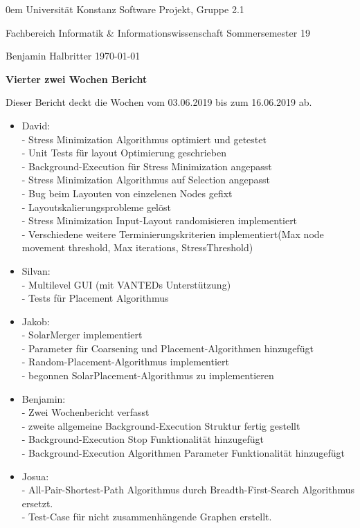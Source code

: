 \documentclass[]{article}
\date{}
\begin{document}
	
	{\footnotesize \parindent0em
		{\sc Universität Konstanz} \hfill {\sc Software Projekt, Gruppe 2.1}\par
		{\sc Fachbereich Informatik \& Informationswissenschaft} \hfill Sommersemester 19 \par
		Benjamin Halbritter \hfill \today\par
		\bigskip
		\begin{center}
			{\LARGE\bf Vierter zwei Wochen Bericht}
			\bigskip
		\end{center}
	}
	
	Dieser Bericht deckt die Wochen vom 03.06.2019 bis zum 16.06.2019 ab. \\
	
	\begin{itemize}
				
		\item  David: \\
		- Stress Minimization Algorithmus optimiert und getestet\\
		- Unit Tests für layout Optimierung geschrieben\\
		- Background-Execution für Stress Minimization angepasst\\
		- Stress Minimization Algorithmus auf Selection angepasst\\
		- Bug beim Layouten von einzelenen Nodes gefixt\\
		- Layoutskalierungsprobleme gelöst\\
		- Stress Minimization Input-Layout randomisieren implementiert\\
		- Verschiedene weitere Terminierungskriterien implementiert(Max node movement threshold, Max iterations, StressThreshold)\\ 
				
		\item Silvan: \\
		- Multilevel GUI (mit VANTEDs Unterstützung)\\
		- Tests für Placement Algorithmus
		
		\item Jakob: \\
		- SolarMerger implementiert\\
		- Parameter für Coarsening und Placement-Algorithmen hinzugefügt\\
		- Random-Placement-Algorithmus implementiert\\
		- begonnen SolarPlacement-Algorithmus zu implementieren
		
		\item Benjamin: \\
		- Zwei Wochenbericht verfasst\\
		- zweite allgemeine Background-Execution Struktur fertig gestellt\\
		- Background-Execution Stop Funktionalität hinzugefügt\\
		- Background-Execution Algorithmen Parameter Funktionalität hinzugefügt 
		
		\item Josua: \\
		- All-Pair-Shortest-Path Algorithmus durch Breadth-First-Search Algorithmus ersetzt.\\
		- Test-Case für nicht zusammenhängende Graphen erstellt.
		
	\end{itemize} 
	
\end{document}
